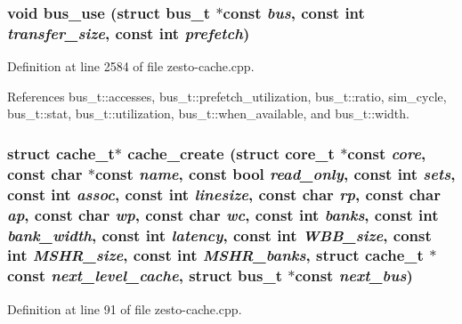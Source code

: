 \subsubsection[{bus\_\-use}]{\setlength{\rightskip}{0pt plus 5cm}void bus\_\-use (struct {\bf bus\_\-t} $\ast$const  {\em bus}, \/  const int {\em transfer\_\-size}, \/  const int {\em prefetch})}\label{zesto-cache_8cpp_cb6440bff7b9405665cbae0d836630f3}




Definition at line 2584 of file zesto-cache.cpp.

References bus\_\-t::accesses, bus\_\-t::prefetch\_\-utilization, bus\_\-t::ratio, sim\_\-cycle, bus\_\-t::stat, bus\_\-t::utilization, bus\_\-t::when\_\-available, and bus\_\-t::width.
\subsubsection[{cache\_\-create}]{\setlength{\rightskip}{0pt plus 5cm}struct {\bf cache\_\-t}$\ast$ cache\_\-create (struct {\bf core\_\-t} $\ast$const  {\em core}, \/  const char $\ast$const  {\em name}, \/  const bool {\em read\_\-only}, \/  const int {\em sets}, \/  const int {\em assoc}, \/  const int {\em linesize}, \/  const char {\em rp}, \/  const char {\em ap}, \/  const char {\em wp}, \/  const char {\em wc}, \/  const int {\em banks}, \/  const int {\em bank\_\-width}, \/  const int {\em latency}, \/  const int {\em WBB\_\-size}, \/  const int {\em MSHR\_\-size}, \/  const int {\em MSHR\_\-banks}, \/  struct {\bf cache\_\-t} $\ast$const  {\em next\_\-level\_\-cache}, \/  struct {\bf bus\_\-t} $\ast$const  {\em next\_\-bus})\hspace{0.3cm}{\tt  [read]}}\label{zesto-cache_8cpp_76fc9319bafb600695d818375fe21ea3}




Definition at line 91 of file zesto-cache.cpp.

